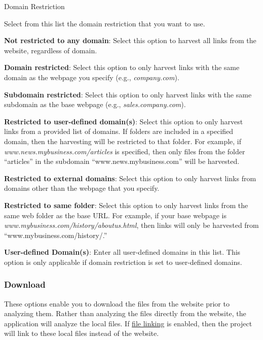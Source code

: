 \documentclass[
]{book}
\newenvironment{optionssection}
    {
    \begin{tcolorbox}[colframe=lightgray,colback=ultralightgray,sharp corners=all,parbox=false]
    }
    {
    \end{tcolorbox}
    }
\newenvironment{optionssectiontitle}
    {
    \begin{tcolorbox}[colframe=lightgray,colback=lightgray]
    \bfseries
    }
    {
    \end{tcolorbox}
    }
\theoremstyle{definition}
\theoremstyle{definition}
\theoremstyle{definition}
\theoremstyle{definition}
\theoremstyle{remark}
\begin{document}
\begin{optionssection}

\begin{optionssectiontitle}
Domain Restriction

\end{optionssectiontitle}

Select from this list the domain restriction that you want to use.

\textbf{Not restricted to any domain}: Select this option to harvest all links from the website, regardless of domain.

\textbf{Domain restricted}: Select this option to only harvest links with the same domain as the webpage you specify (e.g., \emph{company.com}).

\textbf{Subdomain restricted}: Select this option to only harvest links with the same subdomain as the base webpage (e.g., \emph{sales.company.com}).

\textbf{Restricted to user-defined domain(s)}: Select this option to only harvest links from a provided list of domains. If folders are included in a specified domain, then the harvesting will be restricted to that folder. For example, if \emph{www.news.mybusiness.com/articles} is specified, then only files from the folder ``articles'' in the subdomain ``www.news.mybusiness.com'' will be harvested.

\textbf{Restricted to external domains}: Select this option to only harvest links from domains other than the webpage that you specify.

\textbf{Restricted to same folder}: Select this option to only harvest links from the same web folder as the base URL. For example, if your base webpage is \emph{www.mybusiness.com/history/aboutus.html}, then links will only be harvested from ``www.mybusiness.com/history/.''

\end{optionssection}

\textbf{User-defined Domain(s)}: Enter all user-defined domains in this list. This option is only applicable if domain restriction is set to user-defined domains.

\hypertarget{download}{%
\subsubsection*{Download}\label{download}}

These options enable you to download the files from the website prior to analyzing them. Rather than analyzing the files directly from the website, the application will analyze the local files. If \protect\hyperlink{options-document}{file linking} is enabled, then the project will link to these local files instead of the website.
\end{document}

